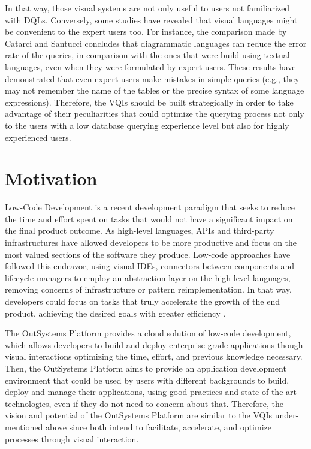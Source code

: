 In that way, those visual systems are not only useful to users not familiarized with \glspl{DQL}. Conversely, some studies have revealed that visual languages might be convenient to the expert users too. For instance, the comparison made by Catarci and Santucci \cite{diagrammaticVsTextualQueryLanguages_aComparativeExperiment} concludes that diagrammatic languages can reduce the error rate of the queries, in comparison with the ones that were build using textual languages, even when they were formulated by expert users. These results have demonstrated that even expert users make mistakes in simple queries (e.g., they may not remember the name of the tables or the precise syntax of some language expressions). Therefore, the \glspl{VQI} should be built strategically in order to take advantage of their peculiarities that could optimize the querying process not only to the users with a low database querying experience level but also for highly experienced users.


\section{Motivation}
\label{sec:motivation}

Low-Code Development is a recent development paradigm that seeks to reduce the time and effort spent on tasks that would not have a significant impact on the final product outcome. As high-level languages, APIs and third-party infrastructures have allowed developers to be more productive and focus on the most valued sections of the software they produce. Low-code approaches have followed this endeavor, using visual \glspl{IDE}, connectors between components and lifecycle managers to employ an abstraction layer on the high-level languages, removing concerns of infrastructure or pattern reimplementation. In that way, developers could focus on tasks that truly accelerate the growth of the end product, achieving the desired goals with greater efficiency \cite{outsystems_whatIsLowCode}.

The OutSystems Platform provides a cloud solution of low-code development, which allows developers to build and deploy enterprise-grade applications though visual interactions optimizing the time, effort, and previous knowledge necessary. Then, the OutSystems Platform aims to provide an application development environment that could be used by users with different backgrounds to build, deploy and manage their applications, using good practices and state-of-the-art technologies, even if they do not need to concern about that. Therefore, the vision and potential of the OutSystems Platform are similar to the \glspl{VQI} under-mentioned above since both intend to facilitate, accelerate, and optimize processes through visual interaction.

